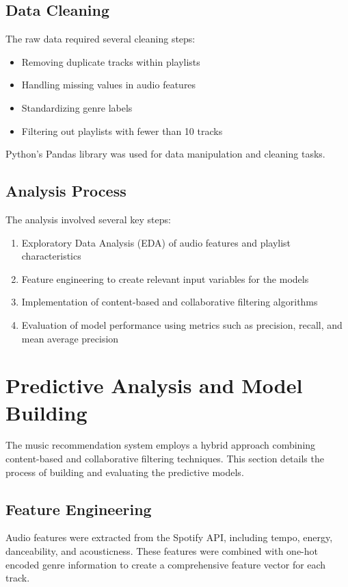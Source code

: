 \documentclass[runningheads]{llncs}
\begin{document}
\subsection{Data Cleaning}
The raw data required several cleaning steps:
\begin{itemize}
    \item Removing duplicate tracks within playlists
    \item Handling missing values in audio features
    \item Standardizing genre labels
    \item Filtering out playlists with fewer than 10 tracks
\end{itemize}

Python's Pandas library was used for data manipulation and cleaning tasks.

\subsection{Analysis Process}
The analysis involved several key steps:
\begin{enumerate}
    \item Exploratory Data Analysis (EDA) of audio features and playlist characteristics
    \item Feature engineering to create relevant input variables for the models
    \item Implementation of content-based and collaborative filtering algorithms
    \item Evaluation of model performance using metrics such as precision, recall, and mean average precision
\end{enumerate}

\section{Predictive Analysis and Model Building}

The music recommendation system employs a hybrid approach combining content-based and collaborative filtering techniques. This section details the process of building and evaluating the predictive models.

\subsection{Feature Engineering}

Audio features were extracted from the Spotify API, including tempo, energy, danceability, and acousticness. These features were combined with one-hot encoded genre information to create a comprehensive feature vector for each track.
\end{document}

